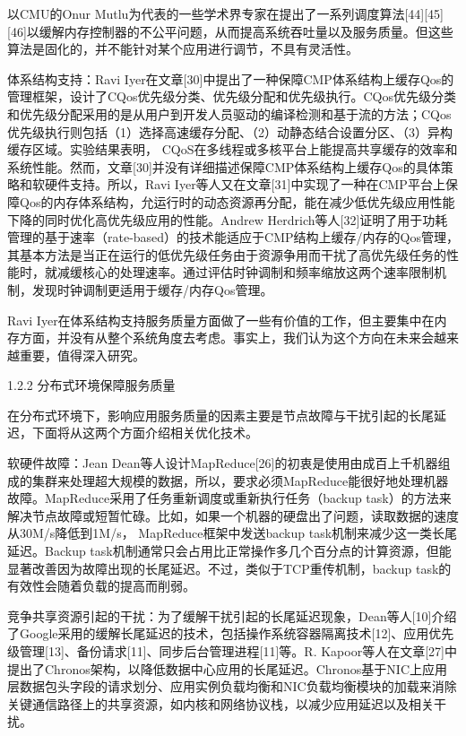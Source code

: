 以CMU的Onur Mutlu为代表的一些学术界专家在提出了一系列调度算法[44][45][46]以缓解内存控制器的不公平问题，从而提高系统吞吐量以及服务质量。但这些算法是固化的，并不能针对某个应用进行调节，不具有灵活性。

体系结构支持：Ravi Iyer在文章[30]中提出了一种保障CMP体系结构上缓存Qos的管理框架，设计了CQos优先级分类、优先级分配和优先级执行。CQos优先级分类和优先级分配采用的是从用户到开发人员驱动的编译检测和基于流的方法；CQos优先级执行则包括（1）选择高速缓存分配、（2）动静态结合设置分区、（3）异构缓存区域。实验结果表明， CQoS在多线程或多核平台上能提高共享缓存的效率和系统性能。然而，文章[30]并没有详细描述保障CMP体系结构上缓存Qos的具体策略和软硬件支持。所以，Ravi Iyer等人又在文章[31]中实现了一种在CMP平台上保障Qos的内存体系结构，允运行时的动态资源再分配，能在减少低优先级应用性能下降的同时优化高优先级应用的性能。Andrew Herdrich等人[32]证明了用于功耗管理的基于速率（rate-based）的技术能适应于CMP结构上缓存/内存的Qos管理，其基本方法是当正在运行的低优先级任务由于资源争用而干扰了高优先级任务的性能时，就减缓核心的处理速率。通过评估时钟调制和频率缩放这两个速率限制机制，发现时钟调制更适用于缓存/内存Qos管理。

Ravi Iyer在体系结构支持服务质量方面做了一些有价值的工作，但主要集中在内存方面，并没有从整个系统角度去考虑。事实上，我们认为这个方向在未来会越来越重要，值得深入研究。
 
1.2.2 分布式环境保障服务质量

在分布式环境下，影响应用服务质量的因素主要是节点故障与干扰引起的长尾延迟，下面将从这两个方面介绍相关优化技术。

软硬件故障：Jean Dean等人设计MapReduce[26]的初衷是使用由成百上千机器组成的集群来处理超大规模的数据，所以，要求必须MapReduce能很好地处理机器故障。MapReduce采用了任务重新调度或重新执行任务（backup task）的方法来解决节点故障或短暂忙碌。比如，如果一个机器的硬盘出了问题，读取数据的速度从30M/s降低到1M/s， MapReduce框架中发送backup task机制来减少这一类长尾延迟。Backup task机制通常只会占用比正常操作多几个百分点的计算资源，但能显著改善因为故障出现的长尾延迟。不过，类似于TCP重传机制，backup task的有效性会随着负载的提高而削弱。


竞争共享资源引起的干扰：为了缓解干扰引起的长尾延迟现象，Dean等人[10]介绍了Google采用的缓解长尾延迟的技术，包括操作系统容器隔离技术[12]、应用优先级管理[13]、备份请求[11]、同步后台管理进程[11]等。R. Kapoor等人在文章[27]中提出了Chronos架构，以降低数据中心应用的长尾延迟。Chronos基于NIC上应用层数据包头字段的请求划分、应用实例负载均衡和NIC负载均衡模块的加载来消除关键通信路径上的共享资源，如内核和网络协议栈，以减少应用延迟以及相关干扰。

